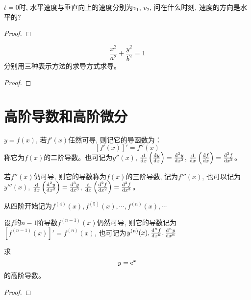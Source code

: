 \begin{example}
    $t = 0$时, 水平速度与垂直向上的速度分别为$v_1$, $v_2$, 问在什么时刻, 速度的方向是水平的?
\end{example}
\begin{proof}
    
\end{proof}

\begin{example}
    \begin{equation*}
        \frac{x^2}{a^2} + \frac{y^2}{b^2} = 1
    \end{equation*}
    分别用三种表示方法的求导方式求导。
\end{example}
\begin{proof}
    
\end{proof}

\section{高阶导数和高阶微分}
\begin{definition}[高阶导数的定义]
    $y=f(x)$, 若$f'(x)$任然可导, 则记它的导函数为：
    \begin{equation*}
        \left[ f'(x) \right]' = f''(x)
    \end{equation*}
    称它为$f(x)$的二阶导数。也可记为$y''(x)$, $\frac{\mathrm{d} }{\mathrm{d} x}\left(\frac{\mathrm{d} y}{\mathrm{d} x}\right) = \frac{\mathrm{d}^2 y}{\mathrm{d} x^2}$, $\frac{\mathrm{d} }{\mathrm{d} x}\left(\frac{\mathrm{d} f}{\mathrm{d} x}\right) = \frac{\mathrm{d}^2 f}{\mathrm{d} x^2}$。

    若$f''(x)$仍可导, 则它的导数称为$f(x)$的三阶导数, 记为$f'''(x)$, 也可以记为$y'''(x)$, $\frac{\mathrm{d} }{\mathrm{d} x}\left(\frac{\mathrm{d}^2 y}{\mathrm{d} x^2}\right) = \frac{\mathrm{d}^3 y}{\mathrm{d} x^3}$, $\frac{\mathrm{d} }{\mathrm{d} x}\left(\frac{\mathrm{d}^2 f}{\mathrm{d} x^2}\right) = \frac{\mathrm{d}^3 f}{\mathrm{d} x^3}$。

    \def\tmp#1{f^{(#1)}(x)}
    从四阶开始记为$\tmp{4}, \tmp{5}, \cdots , \tmp{n}, \cdots$
\end{definition}

\begin{definition}
    \def\tmp#1{f^{(#1)}(x)}
    \def\tmpa#1{y^{(#1)}(x)}
    设$f$的$n-1$阶导数$\tmp{n-1}$仍然可导, 则它的导数记为$\left[ \tmp{n-1}\right]' = \tmp{n}$, 也可记为$\tmpa{n}, \dern{n}{f}{x}, \dern{n}{y}{x}$
\end{definition}

\begin{example}
    求
    \begin{equation*}
        y = \mathrm{e}^x
    \end{equation*}
    的高阶导数。
\end{example}
\begin{proof}
    
\end{proof}


